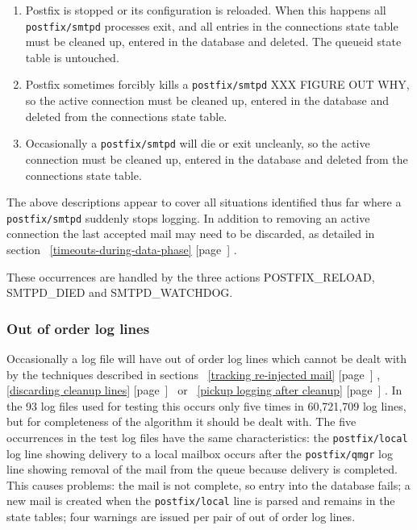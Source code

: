 \documentclass[a4paper,12pt,draft]{article}
\newcommand{\refwithpage}[1]{%
    \empty{}\ref{#1} [page~\pageref{#1}]%
}
\newcommand{\daemon}[1]{%
    \texttt{postfix/#1}%
}
\begin{document}
\begin{enumerate}

    \item Postfix is stopped or its configuration is reloaded.  When this
        happens all \daemon{smtpd} processes exit, and all entries in the
        connections state table must be cleaned up, entered in the database
        and deleted.  The queueid state table is untouched.

    \item Postfix sometimes forcibly kills a \daemon{smtpd} XXX FIGURE OUT
        WHY, so the active connection must be cleaned up, entered in the
        database and deleted from the connections state table.

    \item Occasionally a \daemon{smtpd} will die or exit uncleanly, so the
        active connection must be cleaned up, entered in the database and
        deleted from the connections state table.

\end{enumerate}

The above descriptions appear to cover all situations identified thus far
where a \daemon{smtpd} suddenly stops logging.  In addition to removing an
active connection the last accepted mail may need to be discarded, as
detailed in section~\refwithpage{timeouts-during-data-phase}.

These occurrences are handled by the three actions POSTFIX\_RELOAD,
SMTPD\_DIED and SMTPD\_WATCHDOG\@.

\subsubsection{Out of order log lines}

\label{out of order log lines}

Occasionally a log file will have out of order log lines which cannot be
dealt with by the techniques described in sections~\refwithpage{tracking
re-injected mail},~\refwithpage{discarding cleanup
lines}~or~\refwithpage{pickup logging after cleanup}.  In the 93 log files
used for testing this occurs only five times in 60,721,709 log lines, but
for completeness of the algorithm it should be dealt with.  The five
occurrences in the test log files have the same characteristics: the
\daemon{local} log line showing delivery to a local mailbox occurs after
the \daemon{qmgr} log line showing removal of the mail from the queue
because delivery is completed.  This causes problems: the mail is not
complete, so entry into the database fails; a new mail is created when the
\daemon{local} line is parsed and remains in the state tables; four
warnings are issued per pair of out of order log lines.
\end{document}
